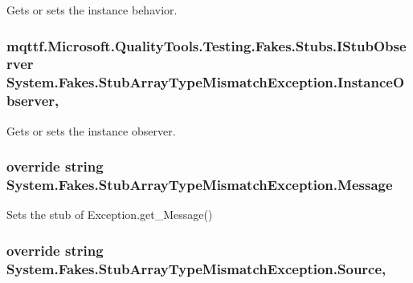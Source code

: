 Gets or sets the instance behavior.

\hypertarget{class_system_1_1_fakes_1_1_stub_array_type_mismatch_exception_ad5512114cc72e58e9012bb59b4f62624}{
\subsubsection[{Instance\-Observer}]{\setlength{\rightskip}{0pt plus 5cm}mqttf.\-Microsoft.\-Quality\-Tools.\-Testing.\-Fakes.\-Stubs.\-I\-Stub\-Observer System.\-Fakes.\-Stub\-Array\-Type\-Mismatch\-Exception.\-Instance\-Observer\hspace{0.3cm}{\ttfamily [get]}, {\ttfamily [set]}}}\label{class_system_1_1_fakes_1_1_stub_array_type_mismatch_exception_ad5512114cc72e58e9012bb59b4f62624}


Gets or sets the instance observer.

\hypertarget{class_system_1_1_fakes_1_1_stub_array_type_mismatch_exception_a4d1cf77f7a322fe82171def13f16649f}{
\subsubsection[{Message}]{\setlength{\rightskip}{0pt plus 5cm}override string System.\-Fakes.\-Stub\-Array\-Type\-Mismatch\-Exception.\-Message\hspace{0.3cm}{\ttfamily [get]}}}\label{class_system_1_1_fakes_1_1_stub_array_type_mismatch_exception_a4d1cf77f7a322fe82171def13f16649f}


Sets the stub of Exception.\-get\-\_\-\-Message()

\hypertarget{class_system_1_1_fakes_1_1_stub_array_type_mismatch_exception_a51c0f6250ede397e44797eb01718280a}{
\subsubsection[{Source}]{\setlength{\rightskip}{0pt plus 5cm}override string System.\-Fakes.\-Stub\-Array\-Type\-Mismatch\-Exception.\-Source\hspace{0.3cm}{\ttfamily [get]}, {\ttfamily [set]}}}\label{class_system_1_1_fakes_1_1_stub_array_type_mismatch_exception_a51c0f6250ede397e44797eb01718280a}


